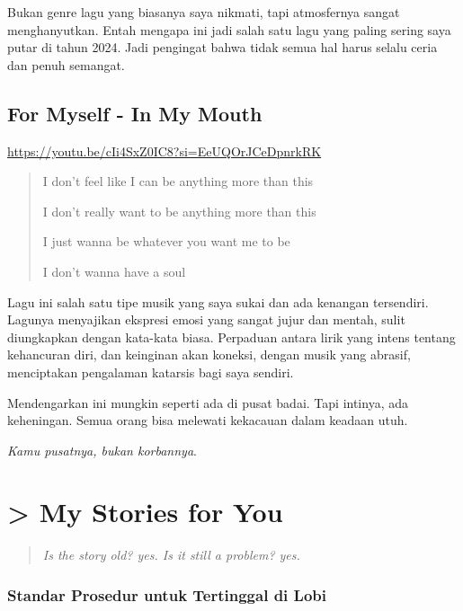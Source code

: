 \documentclass[
  letterpaper,
  DIV=11,
  numbers=noendperiod]{scrreprt}
\begin{document}
Bukan genre lagu yang biasanya saya nikmati, tapi atmosfernya sangat
menghanyutkan. Entah mengapa ini jadi salah satu lagu yang paling sering
saya putar di tahun 2024. Jadi pengingat bahwa tidak semua hal harus
selalu ceria dan penuh semangat.

\section{For Myself - In My Mouth}\label{for-myself---in-my-mouth}

\url{https://youtu.be/cIi4SxZ0IC8?si=EeUQOrJCeDpnrkRK}

\begin{quote}
I don't feel like I can be anything more than this

I don't really want to be anything more than this

I just wanna be whatever you want me to be

I don't wanna have a soul
\end{quote}

Lagu ini salah satu tipe musik yang saya sukai dan ada kenangan
tersendiri. Lagunya menyajikan ekspresi emosi yang sangat jujur dan
mentah, sulit diungkapkan dengan kata-kata biasa. Perpaduan antara lirik
yang intens tentang kehancuran diri, dan keinginan akan koneksi, dengan
musik yang abrasif, menciptakan pengalaman katarsis bagi saya sendiri.

Mendengarkan ini mungkin seperti ada di pusat badai. Tapi intinya, ada
keheningan. Semua orang bisa melewati kekacauan dalam keadaan utuh.

\emph{Kamu pusatnya, bukan korbannya}.


\chapter{\textgreater{} My Stories for You}\label{my-stories-for-you}

\begin{quote}
\emph{Is the story old? yes. Is it still a problem? yes.}
\end{quote}

\subsection{\texorpdfstring{\textbf{Standar Prosedur untuk Tertinggal di
Lobi}}{Standar Prosedur untuk Tertinggal di Lobi}}\label{standar-prosedur-untuk-tertinggal-di-lobi}
\end{document}
